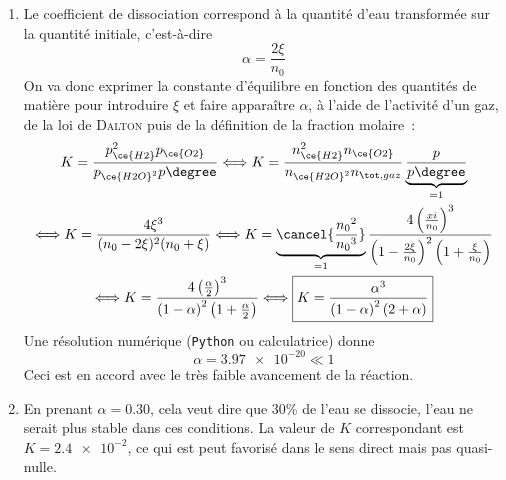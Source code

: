 \documentclass[a4paper, 12pt, final, garamond]{book}
\begin{document}
\begin{enumerate}[resume]
    \item[] Le coefficient de dissociation correspond à la quantité d'eau
        transformée sur la quantité initiale, c'est-à-dire
        \[\alpha = \frac{2\xi}{n_0}\]
        On va donc exprimer la constante d'équilibre en fonction des quantités
        de matière pour introduire $\xi$ et faire apparaître $\alpha$, à l'aide
        de l'activité d'un gaz, de la loi de \textsc{Dalton} puis de la
        définition de la fraction molaire~:
        \begin{gather*}
            K = \frac{p_{\ce{H2}}^2p_{\ce{O2}}}{p_{\ce{H2O}^2}p\degree}
            \Longleftrightarrow
            K = \frac{n_{\ce{H2}}^2n_{\ce{O2}}}{n_{\ce{H2O}^2}n_{\tot, gaz}}
            \underbrace{\frac{p}{p\degree}}_{=1}\\
            \Longleftrightarrow
            K = \frac{4\xi^3}{(n_0-2\xi)^2(n_0+\xi)}
            \Longleftrightarrow
            K = \underbrace{\cancel{\frac{n_0{}^2}{n_0{}^3}}}_{=1}
                \frac{4 \left(\frac{xi}{n_0}\right)^3}
                {\left( 1- \frac{2\xi}{n_0} \right)^2
                \left( 1+ \frac{\xi}{n_0} \right)}\\
            \Longleftrightarrow
            K = \frac{4 \left(\frac{\alpha}{2}\right)^3}
                {\left( 1- \alpha \right)^2
                \left( 1+ \frac{\alpha}{2} \right)}
            \Longleftrightarrow
            \boxed{
            K = \frac{\alpha^3}
                {\left( 1- \alpha \right)^2
                \left( 2+ \alpha \right)}
        }
        \end{gather*}
        Une résolution numérique (\texttt{Python} ou calculatrice) donne
        \[\boxed{\alpha = \num{3.97e-20} \ll 1}\]
        Ceci est en accord avec le très faible avancement de la réaction.
    \item En prenant $\alpha = \num{0.30}$, cela veut dire que 30\% de l'eau se
        dissocie, l'eau ne serait plus stable dans ces conditions. La valeur de
        $K$ correspondant est $K = \num{2.4e-2}$, ce qui est peut favorisé dans
        le sens direct mais pas quasi-nulle.
\end{enumerate}
\end{document}
